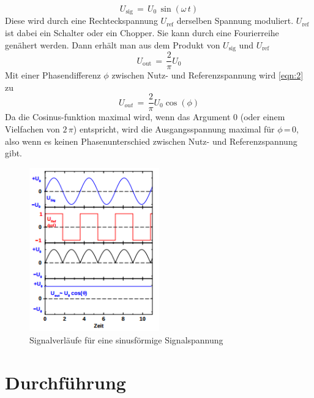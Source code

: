 \documentclass[
  bibliography=totoc,     %
  captions=tableheading,  %
  titlepage=firstiscover, %
]{scrartcl}
\begin{document}
\begin{equation}
  U_\mathup{sig}\,=\,U_0\,\sin({\omega\,t})
  \label{eqn:1}
\end{equation}
Diese wird durch eine Rechteckspannung $U_\mathup{ref}$ derselben Spannung moduliert.
$U_\mathup{ref}$ ist dabei ein Schalter oder ein Chopper. Sie kann durch
eine Fourierreihe genähert werden. Dann erhält man aus dem Produkt von $U_\mathup{sig}$ und $U_\mathup{ref}$
\begin{equation}
  U_\mathup{out}\,=\,\frac{2}{\pi}U_0
  \label{eqn:2}
\end{equation}
Mit einer Phasendifferenz $\phi$ zwischen Nutz- und Referenzspannung wird
\ref{eqn:2} zu
\begin{equation}
  U_{out}\,=\,\frac{2}{\pi}U_0\cos(\phi)
  \label{eqn:3}
\end{equation}
Da die Cosinus-funktion maximal wird, wenn das Argument 0 (oder einem Vielfachen
von $2\,\pi$) entspricht, wird die Ausgangsspannung maximal für $\phi$\,=\,0,
also wenn es keinen Phasenunterschied zwischen Nutz- und Referenzspannung gibt.
\clearpage
\begin{figure}[htb]
  \centering
  \includegraphics[width=0.5\textwidth]{V3034.png}
  \caption{Signalverläufe für eine sinusförmige Signalspannung \cite{anleitung}}
  \label{fig:V3034}
\end{figure}
\section{Durchführung}
\label{sec:durchführung}
\end{document}
